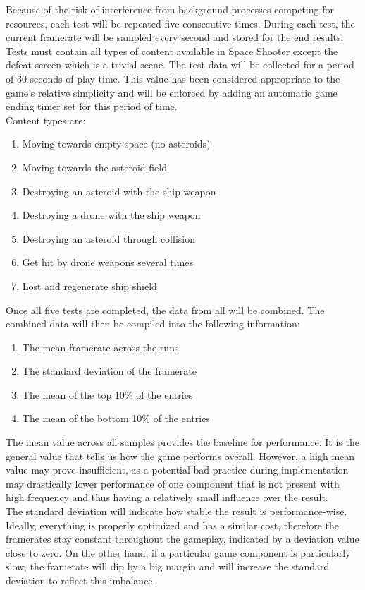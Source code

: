 Because of the risk of interference from background processes competing for resources, each test will be repeated five consecutive times. During each test, the current framerate will be sampled every second and stored for the end results. Tests must contain all types of content available in Space Shooter except the defeat screen which is a trivial scene. The test data will be collected for a period of 30 seconds of play time. This value has been considered appropriate to the game's relative simplicity and will be enforced by adding an automatic game ending timer set for this period of time.\\
Content types are:
\begin{enumerate}
\item Moving towards empty space (no asteroids)
\item Moving towards the asteroid field
\item Destroying an asteroid with the ship weapon
\item Destroying a drone with the ship weapon
\item Destroying an asteroid through collision
\item Get hit by drone weapons several times
\item Lost and regenerate ship shield
\end{enumerate}
Once all five tests are completed, the data from all will be combined. The combined data will then be compiled into the following information:
\begin{enumerate}
\item The mean framerate across the runs
\item The standard deviation of the framerate
\item The mean of the top 10\% of the entries
\item The mean of the bottom 10\% of the entries
\end{enumerate}
The mean value across all samples provides the baseline for performance. It is the general value that tells us how the game performs overall. However, a high mean value may prove insufficient, as a potential bad practice during implementation may drastically lower performance of one component that is not present with high frequency and thus having a relatively small influence over the result. \\
The standard deviation will indicate how stable the result is performance-wise. Ideally, everything is properly optimized and has a similar cost, therefore the framerates stay constant throughout the gameplay, indicated by a deviation value close to zero. On the other hand, if a particular game component is particularly slow, the framerate will dip by a big margin and will increase the standard deviation to reflect this imbalance. \\
